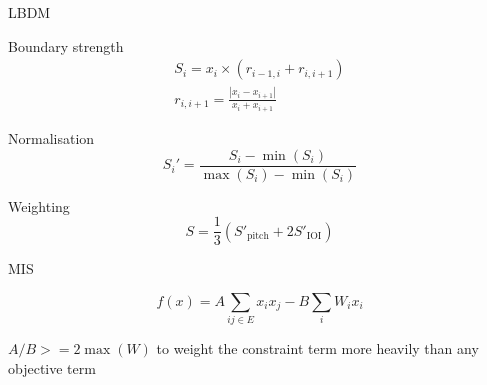 \documentclass[handout]{beamer}
\begin{document}
\begin{frame}{LBDM}
    \begin{block}{Boundary strength}
        \begin{gather*}
            S_i=x_i\times (r_{i-1, i} + r_{i, i+1}) \\
            r_{i, i+1}=\frac{|x_{i}-x_{i+1}|}{x_{i}+x_{i+1}}
        \end{gather*}
    \end{block}
    \begin{block}{Normalisation}
        \begin{equation*}
            S_i'=\frac{S_i-\min(S_i)}{\max(S_i)-\min(S_i)}
        \end{equation*}
    \end{block}
    \begin{block}{Weighting}
        \begin{equation*}
            S=\frac{1}{3}\left( S'_\mathrm{pitch} + 2 S'_\mathrm{IOI} \right)
        \end{equation*}
    \end{block}
    \hfill\cite{cambouropoulos_lbdm_2011}

\end{frame}

\begin{frame}{MIS}

    \begin{equation*}
        f(x)=A\sum_{ij\in E}x_ix_j-B\sum_i W_ix_i
    \end{equation*}
    \hfill\cite{lucas_ising_2014}

    $A/B>=2\max(W)$ to weight the constraint term more heavily than any objective term

\end{frame}
\end{document}
